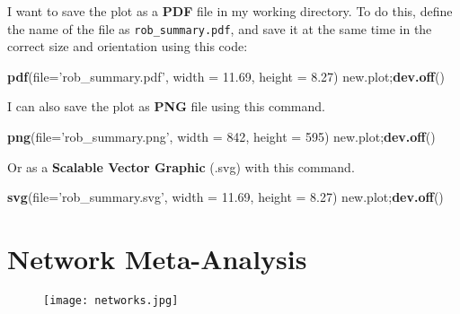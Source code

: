 \documentclass[]{book}
\newenvironment{Shaded}{\begin{snugshade}}{\end{snugshade}}
\newcommand{\KeywordTok}[1]{\textcolor[rgb]{0.13,0.29,0.53}{\textbf{#1}}}
\newcommand{\DataTypeTok}[1]{\textcolor[rgb]{0.13,0.29,0.53}{#1}}
\newcommand{\DecValTok}[1]{\textcolor[rgb]{0.00,0.00,0.81}{#1}}
\newcommand{\FloatTok}[1]{\textcolor[rgb]{0.00,0.00,0.81}{#1}}
\newcommand{\StringTok}[1]{\textcolor[rgb]{0.31,0.60,0.02}{#1}}
\newcommand{\NormalTok}[1]{#1}
\theoremstyle{definition}
\theoremstyle{definition}
\theoremstyle{definition}
\theoremstyle{remark}
\begin{document}
I want to save the plot as a \textbf{PDF} file in my working directory.
To do this, define the name of the file as \texttt{rob\_summary.pdf},
and save it at the same time in the correct size and orientation using
this code:

\begin{Shaded}
\begin{Highlighting}[]
\KeywordTok{pdf}\NormalTok{(}\DataTypeTok{file=}\StringTok{'rob_summary.pdf'}\NormalTok{, }\DataTypeTok{width =} \FloatTok{11.69}\NormalTok{, }\DataTypeTok{height =} \FloatTok{8.27}\NormalTok{) }
\NormalTok{new.plot;}\KeywordTok{dev.off}\NormalTok{() }
\end{Highlighting}
\end{Shaded}

I can also save the plot as \textbf{PNG} file using this command.

\begin{Shaded}
\begin{Highlighting}[]
\KeywordTok{png}\NormalTok{(}\DataTypeTok{file=}\StringTok{'rob_summary.png'}\NormalTok{, }\DataTypeTok{width =} \DecValTok{842}\NormalTok{, }\DataTypeTok{height =} \DecValTok{595}\NormalTok{) }
\NormalTok{new.plot;}\KeywordTok{dev.off}\NormalTok{() }
\end{Highlighting}
\end{Shaded}

Or as a \textbf{Scalable Vector Graphic} (.svg) with this command.

\begin{Shaded}
\begin{Highlighting}[]
\KeywordTok{svg}\NormalTok{(}\DataTypeTok{file=}\StringTok{'rob_summary.svg'}\NormalTok{, }\DataTypeTok{width =} \FloatTok{11.69}\NormalTok{, }\DataTypeTok{height =} \FloatTok{8.27}\NormalTok{) }
\NormalTok{new.plot;}\KeywordTok{dev.off}\NormalTok{() }
\end{Highlighting}
\end{Shaded}

\chapter{Network Meta-Analysis}\label{network-meta-analysis}

\begin{figure}
\centering
\texttt{[image: networks.jpg]}
\caption{}
\end{figure}
\end{document}
